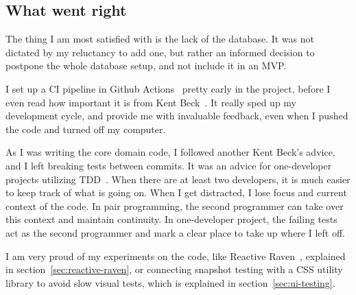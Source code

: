\subsection{What went right}\label{sec:what-went-right}

The thing I am most satisfied with
is the lack of the database.
It was not dictated by my reluctancy to add one,
but rather an informed decision
to postpone the whole database setup,
and not include it in an MVP.

I set up a CI pipeline
in Github Actions~\cite{github_inc_github_2022-1}
pretty early in the project,
before I even read how important it is
from Kent Beck~\cite{beck_extreme_2004}.
It really sped up my development cycle,
and provide me with invaluable feedback,
even when I pushed the code and turned off my computer.

As I was writing the core domain code,
I followed another Kent Beck's advice,
and I left breaking tests between commits.
It was an advice for one-developer projects
utilizing TDD~\cite{beck_test-driven_2002}.
When there are at least two developers,
it is much easier to keep track of what is going on.
When I get distracted,
I lose focus and current context of the code.
In pair programming,
the second programmer can take over this context
and maintain continuity.
In one-developer project,
the failing tests act as the second programmer
and mark a clear place to take up where I left off.

I am very proud of my experiments
on the code,
like Reactive Raven~\cite{sewera_reactive_2022},
explained in section~\ref{sec:reactive-raven},
or connecting snapshot testing
with a CSS utility library
to avoid slow visual tests,
which is explained in section~\ref{sec:ui-testing}.
